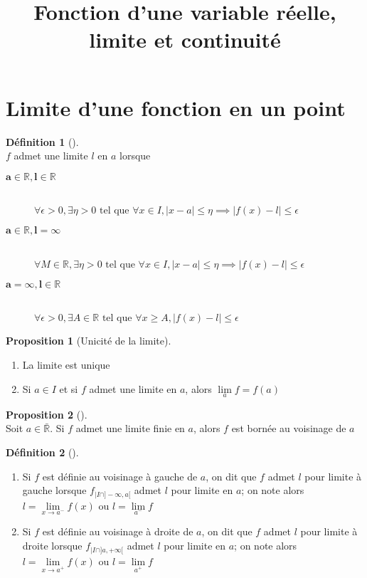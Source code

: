\documentclass{article}
\title{Fonction d'une variable réelle, limite et continuité}
\newcommand{\R}{\mathbb{R}}
\newcommand{\tq}{\text{ tel que }}
\newcommand{\lm}{\lim\limits}
\newcommand{\bs}[1]{\boldsymbol{#1}}
\theoremstyle{definition}
\newtheorem*{prop}{Proposition}
\newtheorem*{defin}{Définition}
\theoremstyle{remark}
\theoremstyle{plain}
\newenvironment{prp}[1][]
{\begin{prop}[#1]\quad\\}
{\end{prop}}
\newenvironment{dfn}[1][]
{\begin{defin}[#1]\quad\\}
{\end{defin}}
\begin{document}
\maketitle
\pagebreak

\section{Limite d'une fonction en un point}
\begin{dfn} 
$f$ admet une limite $l$ en $a$ lorsque
\begin{description}
    \item[$\bs{a \in \R, l \in \R}$] \hfill \\
    $\forall \epsilon > 0, \exists \eta > 0 \tq \forall x \in I, |x - a|
    \leq \eta \implies |f(x) - l| \leq \epsilon$
    \item[$\bs{a \in \R, l = \infty}$] \hfill \\
    $\forall M \in \R, \exists \eta > 0 \tq \forall x \in I,
    |x - a| \leq \eta \implies |f(x) - l| \leq \epsilon$
    \item[$\bs{a = \infty, l \in \R}$] \hfill \\
    $\forall \epsilon > 0, \exists A \in \R \tq \forall x \geq A,
    |f(x) - l| \leq \epsilon$
\end{description}
\end{dfn}

\begin{prp}[Unicité de la limite] 
\begin{enumerate}
    \item La limite est unique
    \item Si $a \in I$ et si $f$ admet une limite en $a$, alors
    $\lm_{a} f = f(a)$
\end{enumerate}
\end{prp}

\begin{prp} 
Soit $a \in \bar{\R}$. Si $f$ admet une limite finie en $a$, alors
$f$ est bornée au voisinage de $a$
\end{prp}

\begin{dfn} 
\begin{enumerate}
    \item Si $f$ est définie au voisinage à gauche de $a$, on dit que
    $f$ admet $l$ pour limite à gauche lorsque $f_{|I\cap ]-\infty, a[}$
    admet $l$ pour limite en $a$; on note alors
    $l = \lm_{x \to a^-} f(x)$ ou $l = \lm_{a^-} f$
    \item Si $f$ est définie au voisinage à droite de $a$, on dit que
    $f$ admet $l$ pour limite à droite lorsque $f_{|I\cap ]a, +\infty[}$
    admet $l$ pour limite en $a$; on note alors
    $l = \lm_{x \to a^+} f(x)$ ou $l = \lm_{a^+} f$
\end{enumerate}
\end{dfn}
\end{document}
